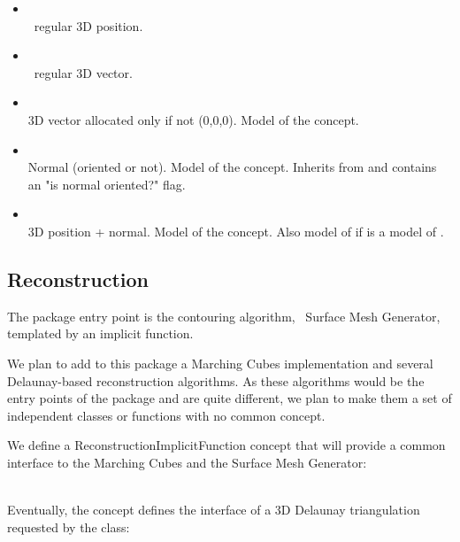 \begin{itemize}
\item {} \\
\cgal\ regular 3D position.
\item {} \\
\cgal\ regular 3D vector.
\item {} \\
3D vector allocated only if not (0,0,0).
Model of the  concept.
\item {} \\
Normal (oriented or not).
Model of the  concept.
Inherits from  and contains an "is normal oriented?" flag.
\item {} \\
3D position + normal.
Model of the  concept.
Also model of  if  is a model of .
\end{itemize}


\subsection{Reconstruction}

The package entry point is the contouring algorithm, \cgal\ Surface Mesh Generator,
templated by an implicit function.

We plan to add to this package a Marching Cubes implementation and
several Delaunay-based reconstruction algorithms.
As these algorithms would be the entry points of the package and are quite
different, we plan to make them a set of independent classes or functions
with no common concept.

We define a ReconstructionImplicitFunction concept that will provide
a common interface to the Marching Cubes and the Surface Mesh Generator:

  \\

Eventually, the  concept defines the interface of a 3D Delaunay triangulation requested by the  class:

  \\


